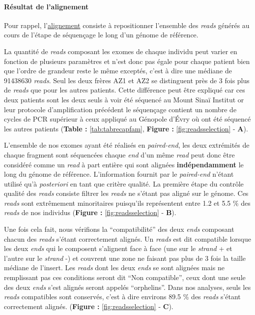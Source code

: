\documentclass[12pt,twoside]{reedthesis}
\theoremstyle{definition}
\theoremstyle{definition}
\theoremstyle{remark}
\begin{document}
  \paragraph{Résultat de l'alignement}\label{resultat-de-lalignement}
  
  Pour rappel, l'\href{\%7B\#lalignement\%7D}{alignement} consiste à
  repositionner l'ensemble des \emph{reads} générés au cours de l'étape de
  séquençage le long d'un génome de référence.
  
  La quantité de \emph{reads} composant les exomes de chaque individu peut
  varier en fonction de plusieurs paramètres et n'est donc pas égale pour
  chaque patient bien que l'ordre de grandeur reste le même exceptés,
  c'est à dire une médiane de 91438630 \emph{reads}. Seul les deux frères
  AZ1 et AZ2 se distinguent près de 3 fois plus de \emph{reads} que pour
  les autres patients. Cette différence peut être expliqué car ces deux
  patients sont les deux seuls à voir été séquencé au Mount Sinaï Institut
  or leur protocole d'amplification précédent le séquençage contient un
  nombre de cycles de PCR supérieur à ceux appliqué au Génopole d'Évry où
  ont été séquencé les autres patients (\textbf{Table :}
  \ref{tab:tabrecapfam}, \textbf{Figure : }\ref{fig:readsselection} -
  \textbf{A}).
  
  L'ensemble de nos exomes ayant été réalisés en \emph{paired-end}, les
  deux extrémités de chaque fragment sont séquencées chaque \emph{end}
  d'un même \emph{read} peut donc être considéré comme un \emph{read} à
  part entière qui sont alignées \textbf{indépendamment} le long du génome
  de référence. L'information fournit par le \emph{paired-end} n'étant
  utilisé qu'à \emph{posteriori} en tant que critère qualité. La première
  étape du contrôle qualité des \emph{reads} consiste filtrer les
  \emph{reads} ne s'étant pas aligné sur le génome. Ces \emph{reads} sont
  extrêmement minoritaires puisqu'ils représentent entre 1.2 et 5.5 \% des
  \emph{reads} de nos individus (\textbf{Figure :
  }\ref{fig:readsselection} - \textbf{B}).
  
  Une fois cela fait, nous vérifions la ``compatibilité'' des deux
  \emph{ends} composant chacun des \emph{reads} s'étant correctement
  alignés. Un \emph{reads} est dit compatible lorsque les deux \emph{ends}
  qui le composent s'alignent face à face (une sur le \emph{strand} + et
  l'autre sur le \emph{strand} -) et couvrent une zone ne faisant pas plus
  de 3 fois la taille médiane de l'insert. Les \emph{reads} dont les deux
  \emph{ends} se sont alignées mais ne remplissant pas ces conditions
  seront dit ``Non compatible'', ceux dont une seule des deux \emph{ends}
  s'est alignés seront appelés ``orphelins''. Dans nos analyses, seuls les
  \emph{reads} compatibles sont conservés, c'est à dire environs 89.5 \%
  des \emph{reads} s'étant correctement alignés. (\textbf{Figure :
  }\ref{fig:readsselection} - \textbf{C}).
  
\end{document}
